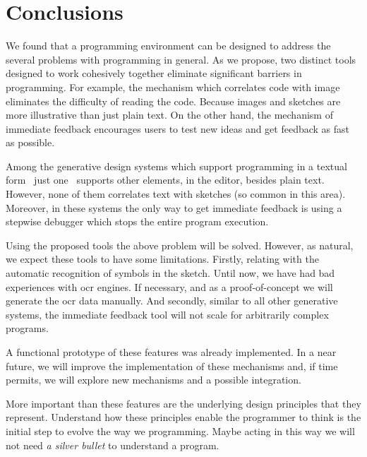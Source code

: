 
% 
% 

\section{Conclusions}
\label{sec:fin}

We found that a programming environment can be designed to address the several problems with programming in general. As we propose, two distinct tools designed to work cohesively together eliminate significant barriers in programming. For example, the mechanism which correlates code with image eliminates the difficulty of reading the code. Because images and sketches are more illustrative than just plain text. On the other hand, the mechanism of immediate feedback encourages users to test new ideas and get feedback as fast as possible.

Among the generative design systems which support programming in a textual form~\cite{aish2012designscript,lopes2011portable} just one~\cite{lopes2011portable} supports other elements, in the editor, besides plain text. However, none of them correlates text with sketches (so common in this area). Moreover, in these systems the only way to get immediate feedback is using a stepwise debugger which stops the entire program execution.

Using the proposed tools the above problem will be solved. However, as natural, we expect these tools to have some limitations. Firstly, relating with the automatic recognition of symbols in the sketch. Until now, we have had bad experiences with \ac{ocr} engines. If necessary, and as a proof-of-concept we will generate the \ac{ocr} data manually. And secondly, similar to all other generative systems, the immediate feedback tool will not scale for arbitrarily complex programs.

A functional prototype of these features was already implemented. In a near future, we will improve the implementation of these mechanisms and, if time permits, we will explore new mechanisms and a possible integration.

More important than these features are the underlying design principles that they represent. Understand how these principles enable the programmer to think is the initial step to evolve the way we programming. Maybe acting in this way we will not need \textit{a silver bullet} to understand a program.